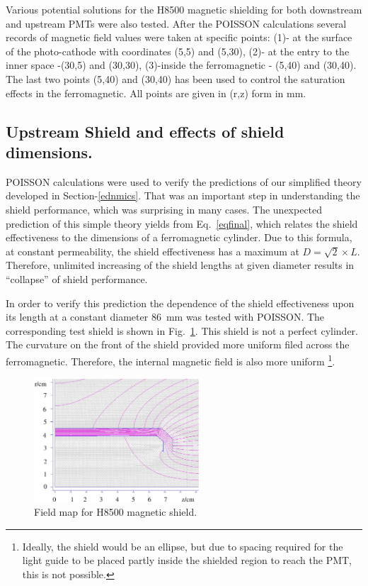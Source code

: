 \documentclass[12pt]{article}
\begin{document}
Various potential solutions for the H8500 magnetic shielding for both  
downstream and upstream PMTs were also tested.
After  the POISSON calculations several  records of  magnetic field values were taken 
at specific  points: 
(1)- at the surface of the photo-cathode with  coordinates  (5,5) and (5,30),
(2)- at the entry to the inner space -(30,5) and (30,30), 
(3)-inside the ferromagnetic - (5,40) and (30,40). 
The last two points (5,40) and (30,40) has been used 
 to control the saturation effects in the  ferromagnetic. All points are given in 
(r,z) form in mm.

\subsection{Upstream Shield  and  effects of  shield dimensions.}
\label{emsdimen}
POISSON calculations were used to verify the predictions of our 
simplified theory developed in Section-\ref{ednmics}.
That was an important step in understanding the shield performance, 
which was surprising in many cases.
The  unexpected prediction of this  simple theory yields  from  
Eq.~\ref{eqfinal}, which  relates the shield
effectiveness to the dimensions of a ferromagnetic cylinder. 
Due to this formula,  at constant permeability, the shield effectiveness has a
maximum at $D =\sqrt{2}\times L$.  Therefore,  unlimited increasing of  
the shield   lengths  at given diameter results in  ``collapse'' 
 of shield performance.

In order to verify this prediction
the dependence of the shield effectiveness upon its length at a constant diameter 
86~mm was tested with POISSON.  The  corresponding test  shield is 
shown in Fig.~\ref{Upstream_PMT_Design}. This  shield is not a 
perfect cylinder. The curvature on the front of the shield provided more uniform 
filed across the ferromagnetic.
Therefore,  the internal magnetic field is also more uniform
\footnote{Ideally, the shield would
be an ellipse, but due to spacing required for the light guide to
be placed partly inside the shielded region to reach the PMT, 
this is not possible.}.
%
\begin{figure}%
\centering
\includegraphics[width=0.55\textwidth]{H8500_Upstream_NETIC_6mmThick_69mmLength.eps}
\caption{\small{Field map for H8500 magnetic shield.}}
\label{Upstream_PMT_Design}
\end{figure}
%
\end{document}
